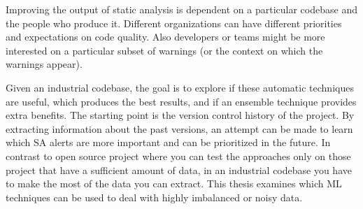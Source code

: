\documentclass{article}
\begin{document}




Improving the output of static analysis is dependent on a particular codebase and the people who produce it. Different organizations can have different priorities and expectations on code quality. Also developers or teams might be more interested on a particular subset of warnings (or the context on which the warnings appear).

Given an industrial codebase, the goal is to explore if these automatic techniques are useful, which produces the best results, and if an ensemble technique provides extra benefits. The starting point is the version control history of the project. By extracting information about the past versions, an attempt can be made to learn which SA alerts are more important and can be prioritized in the future. In contrast to open source project where you can test the approaches only on those project that have a sufficient amount of data, in an industrial codebase you have to make the most of the data you can extract. This thesis examines which ML techniques can be used to deal with highly imbalanced or noisy data.
\end{document}
